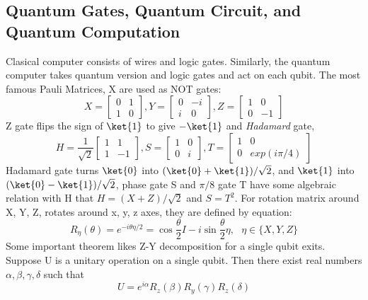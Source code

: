 \subsection*{Quantum Gates, Quantum Circuit, and Quantum Computation}
Clasical computer consists of wires and logic gates. Similarly, 
the quantum computer takes quantum version and logic gates and act on 
each qubit. The most famous Pauli Matrices, X are used as NOT gates: 
\begin{equation}
  X = \begin{bmatrix}
    0 & 1 \\ 1 & 0 
  \end{bmatrix},
  Y = \begin{bmatrix}
    0 & -i \\ i & 0 
  \end{bmatrix},
  Z = \begin{bmatrix}
    1 & 0 \\ 0 & -1 
  \end{bmatrix}
\end{equation}
Z gate flips the sign of $\ket{1}$ to give $-\ket{1}$ and 
\textit{Hadamard} gate, 
\begin{equation}
  H =  \frac{1}{\sqrt{2}}\begin{bmatrix}
    1 & 1 \\ 1 & -1
  \end{bmatrix}, S = \begin{bmatrix}
    1 & 0 \\ 0 & i
  \end{bmatrix}, T = \begin{bmatrix}
    1 & 0 \\ 0 & exp(i \pi/4)
  \end{bmatrix}
\end{equation}
Hadamard gate turns $\ket{0}$ into $(\ket{0}+\ket{1})/\sqrt{2}$, and 
$\ket{1}$ into $(\ket{0}-\ket{1})/\sqrt{2}$, phase gate S and $\pi/8$ gate T 
have some algebraic relation with H that $H = (X+Z)/\sqrt{2}$ and 
$S = T^2$. For rotation matrix around X, Y, Z, rotates around x, y, z axes, 
they are defined by equation:
$$R_{\eta}(\theta) = e^{-i \theta \eta /2} = \cos \frac{\theta}{2}I -i \sin \frac{\theta}{2} \eta, \ \ \ \eta \in \{X,Y,Z\}$$
Some important theorem likes Z-Y decomposition for a single qubit 
exits. Suppose U is a unitary operation on a single qubit. Then there exist
real numbers $\alpha, \beta, \gamma, \delta$ such that 
\begin{equation}
  U = e^{i \alpha} R_z(\beta) R_y (\gamma) R_z(\delta)
\end{equation}

